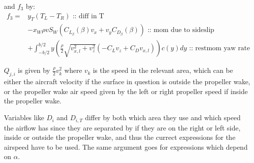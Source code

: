 and $f_3$ by:
\begin{equation}\begin{split}
    f_3 =& 
    y_T \left( T_L - T_R \right) \text{ :: diff in T}\\
    &- x_W \rho v S_W  \left( C_{L_\beta}(\beta) v_x + v_y C_{D_\beta}(\beta) \right) \text{ :: mom due to sideslip} \\
    &+  \int_{-b/2}^{b/2} y \left( \frac{\rho}{2} \sqrt{v_{x,l}^2 + v_z^2} \left( -C_L v_z + C_D v_{x,l} \right) \right) c(y) dy \text{ :: restmom yaw rate}
\end{split}\end{equation}

$Q_{j,i}$ is given by $\frac{\rho}{2} v_k^2$ where $v_k$ is the speed in the relevant area, which can be either the aircraft velocity if the surface in question is outside the propeller wake, or the propeller wake air speed given by the left or right propeller speed if inside the propeller wake.

Variables like $D_i$ and $D_{i,T}$ differ by both which area they use and which speed the airflow has since they are separated by if they are on the right or left side, inside or outside the propeller wake, and thus the currect expressions for the airspeed have to be used.
The same argument goes for expressions which depend on $\alpha$.